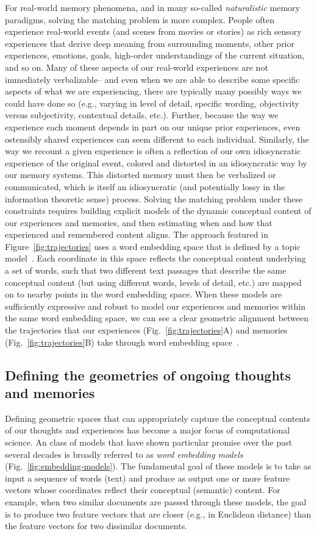 \documentclass{article}
\begin{document}
For real-world memory phenomena, and in many so-called \textit{naturalistic} memory paradigms, solving the matching problem is more complex.  People often experience real-world events (and scenes from movies or stories) as rich sensory experiences that derive deep meaning from surrounding moments, other prior experiences, emotions, goals, high-order understandings of the current situation, and so on.  Many of these aspects of our real-world experiences are not immediately verbalizable-- and even when we are able to describe some specific aspects of what we are experiencing, there are typically many possibly ways we could have done so (e.g., varying in level of detail, specific wording, objectivity versus subjectivity, contextual details, etc.).  Further, because the way we experience each moment depends in part on our unique prior experiences, even ostensibly shared experiences can seem different to each individual.  Similarly, the way we recount a given experience is often a reflection of our own idiosyncratic experience of the original event, colored and distorted in an idiosyncratic way by our memory systems.  This distorted memory must then be verbalized or communicated, which is itself an idiosyncratic (and potentially lossy in the information theoretic sense) process.  Solving the matching problem under these constraints requires building explicit models of the dynamic conceptual content of our experiences and memories, and then estimating when and how that experienced and remembered content aligns.  The approach featured in Figure~\ref{fig:trajectories} uses a word embedding space that is defined by a topic model~\citep{BleiEtal03}.  Each coordinate in this space reflects the conceptual content underlying a set of words, such that two different text passages that describe the same conceptual content (but using different words, levels of detail, etc.) are mapped on to nearby points in the word embedding space.  When these models are sufficiently expressive and robust to model our experiences and memories within the same word embedding space, we can see a clear geometric alignment between the trajectories that our experiences (Fig.~\ref{fig:trajectories}A) and memories (Fig.~\ref{fig:trajectories}B) take through word embedding space~\citep[also see][]{HeusEtal18c}.

\subsection*{Defining the geometries of ongoing thoughts and memories}
Defining geometric spaces that can appropriately capture the conceptual contents of our thoughts and experiences has become a major focus of computational science.  An class of models that have shown particular promise over the past several decades is broadly referred to as \textit{word embedding models} (Fig.~\ref{fig:embedding-models}).  The fundamental goal of these models is to take as input a sequence of words (text) and produce as output one or more feature vectors whose coordinates reflect their conceptual (semantic) content.  For example, when two similar documents are passed through these models, the goal is to produce two feature vectors that are closer (e.g., in Euclidean distance) than the feature vectors for two dissimilar documents.
\end{document}
